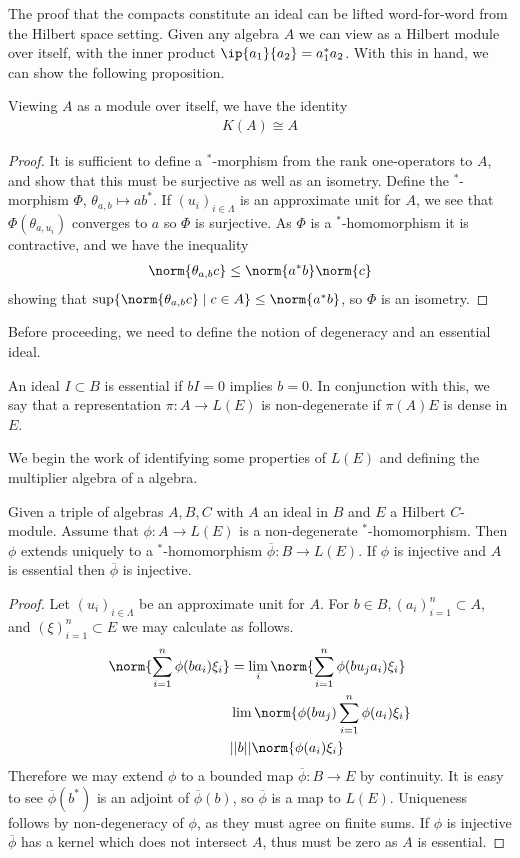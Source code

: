 The proof that the compacts constitute an ideal can be lifted word-for-word from the Hilbert space setting. 
Given any \Cstar algebra $A$ we can view as a Hilbert module over itself, with the inner product $\ip{a_1}{a_2}=a_1^*a_2$. With this in hand, we can show the following proposition.
\begin{proposition}
	Viewing $A$ as a module over itself, we have the identity 
	\begin{align*}
		K(A)\cong A
	\end{align*}
\end{proposition}
\begin{proof}
	It is sufficient to define a $^*$-morphism from the rank one-operators to $A$, and show that this must be surjective as well as an isometry. Define the $^*$-morphism $\Phi$, $\theta_{a,b}\mapsto ab^*$. If $(u_i)_{i\in \Lambda}$ is an approximate unit for $A$, we see that $\Phi(\theta_{a,u_i})$ converges to $a$ so $\Phi$ is surjective. As $\Phi$ is a $^*$-homomorphism it is contractive, and we have the inequality 
	\begin{align*}
		\norm{\theta_{a,b}c}\leq \norm{a^*b}\norm{c}
	\end{align*}
	showing that $\sup\{\norm{\theta_{a,b}c} \mid c\in A\}\leq \norm{a^*b}$, so $\Phi$ is an isometry. 
\end{proof}
 Before proceeding, we need to define the notion of degeneracy and an essential ideal. 
\begin{definition}
	An ideal $I\subset B$ is essential if $bI=0$ implies $b=0$. In conjunction with this, we say that a representation $\pi:A\to L(E)$ is non-degenerate if $\pi(A)E$ is dense in $E$. 
\end{definition}
We begin the work of identifying some properties of $L(E)$ and defining the multiplier algebra of a \Cstar algebra.
\begin{proposition}\label{multiplier1}
	Given a triple of \Cstar algebras $A,B,C$ with $A$ an ideal in $B$ and $E$ a Hilbert $C$-module. Assume that $\phi:A\to L(E)$ is a non-degenerate $^*$-homomorphism. Then $\phi$ extends uniquely to a $^*$-homomorphism $\overline{\phi}:B\to L(E)$. If $\phi$ is injective and $A$ is essential then $\overline{\phi}$ is injective. 
\end{proposition}
\begin{proof}
	Let $(u_i)_{i\in \Lambda}$ be an approximate unit for $A$. For $b\in B,(a_i)_{i=1}^n \subset A$, and $(\xi)_{i=1}^n\subset E$ we may calculate as follows. 
	\begin{align*}
		\norm{\sum_{i=1}^n \phi(ba_i)\xi_i}&=\lim_{i}\norm{\sum_{i=1}^n\phi(bu_ja_i)\xi_i} \\
		&\lim\norm{\phi(bu_j)\sum_{i=1}^n \phi(a_i)\xi_i} \\
		&||b|| \norm{\phi(a_i)\xi_i}
	\end{align*}
	Therefore we may extend $\phi$ to a bounded map $\overline{\phi}:B\to E$ by continuity. It is easy to see $\overline{\phi}(b^*)$ is an adjoint of $\overline{\phi}(b)$, so $\overline{\phi}$ is a map to $L(E)$. Uniqueness follows by non-degeneracy of $\phi$, as they  must agree on finite sums. If $\phi$ is injective $\overline{\phi}$ has a kernel which does not intersect $A$, thus must be zero as $A$ is essential.  
\end{proof}
